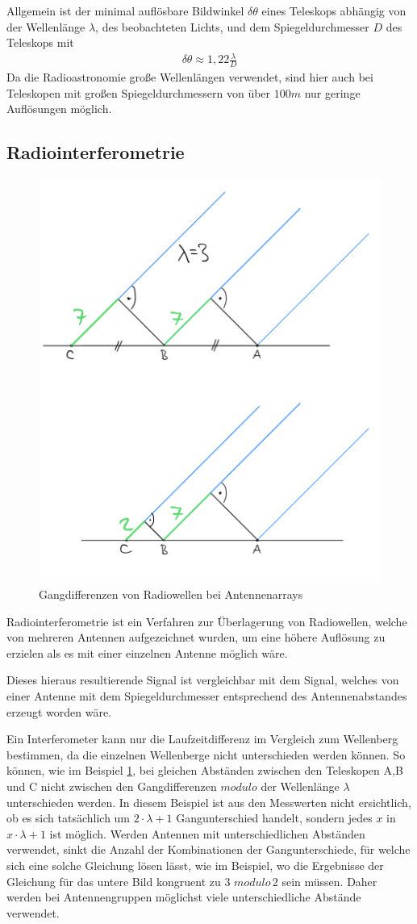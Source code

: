 \documentclass[]{dsadokumentation}
\begin{document}
Allgemein ist der minimal auflösbare Bildwinkel $\delta\theta$ eines Teleskops abhängig von der Wellenlänge $\lambda$, des beobachteten Lichts, und dem Spiegeldurchmesser $D$ des Teleskops mit \begin{eqnarray}
\delta\theta\approx1,22\frac{\lambda}{D}
\end{eqnarray}
Da die Radioastronomie große Wellenlängen verwendet, sind hier auch bei Teleskopen mit großen Spiegeldurchmessern von über $100m$ nur geringe Auflösungen möglich.

\subsection{Radiointerferometrie}
\begin{figure}[htb]
\centering
\includegraphics[width=.4\textwidth]{k4.2/baselineunterschied.png}
\caption{Gangdifferenzen von Radiowellen bei Antennenarrays}
\label{bild-baselineunterschied}
\end{figure}

Radiointerferometrie ist ein Verfahren zur Überlagerung von Radiowellen, welche von mehreren Antennen aufgezeichnet wurden, um eine höhere Auflösung zu erzielen als es mit einer einzelnen Antenne möglich wäre.

Dieses hieraus resultierende Signal ist vergleichbar mit dem Signal, welches von einer Antenne mit dem Spiegeldurchmesser entsprechend des Antennenabstandes erzeugt worden wäre.

Ein Interferometer kann nur die Laufzeitdifferenz im Vergleich zum Wellenberg bestimmen, da die einzelnen Wellenberge nicht unterschieden werden können. So können, wie im Beispiel  \ref{bild-baselineunterschied}, bei gleichen Abständen zwischen den Teleskopen A,B und C nicht zwischen den Gangdifferenzen $modulo$ der Wellenlänge $\lambda$ unterschieden werden. In diesem Beispiel ist aus den Messwerten nicht ersichtlich, ob es sich tatsächlich um $2\cdot \lambda +1$ Gangunterschied handelt, sondern jedes $x$ in $x\cdot\lambda+1$ ist möglich. Werden Antennen mit unterschiedlichen Abständen verwendet, sinkt die Anzahl der Kombinationen der Gangunterschiede, für welche sich eine solche Gleichung lösen lässt, wie im Beispiel, wo die Ergebnisse der Gleichung für das untere Bild kongruent zu 3 $modulo\,2$ sein müssen. Daher werden bei Antennengruppen möglichst viele unterschiedliche Abstände verwendet.
\end{document}
